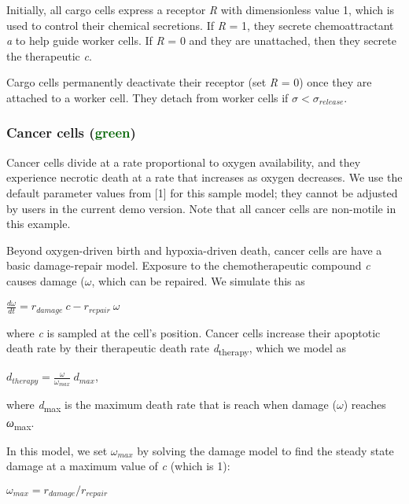 \documentclass{article}
\begin{document}
Initially, all cargo cells express a receptor \emph{R} with
dimensionless value 1, which is used to control their chemical
secretions. If \emph{R} = 1, they secrete chemoattractant \emph{a} to
help guide worker cells. If \emph{R} = 0 and they are unattached, then
they secrete the therapeutic \emph{c}.

Cargo cells permanently deactivate their receptor (set \emph{R} = 0)
once they are attached to a worker cell. They detach from worker cells
if $\sigma < \sigma_{release}$.

\subsubsection{Cancer cells (\textcolor{darkgreen}{green})}\label{cancer-cells-green}

Cancer cells divide at a rate proportional to oxygen availability, and
they experience necrotic death at a rate that increases as oxygen
decreases. We use the default parameter values from {[}1{]} for this
sample model; they cannot be adjusted by users in the current demo
version. Note that all cancer cells are non-motile in this example.

Beyond oxygen-driven birth and hypoxia-driven death, cancer cells are
have a basic damage-repair model. Exposure to the chemotherapeutic
compound \emph{c} causes damage ($\omega$, which can be repaired. We
simulate this as

\begin{center}
$\frac{d\omega}{dt} = r_{damage} \: c - r_{repair} \: \omega$
\end{center}

where \emph{c} is sampled at the cell's position. Cancer cells increase
their apoptotic death rate by their therapeutic death rate
\emph{d}\textsubscript{therapy}, which we model as

\begin{center}
$d_{therapy} = \frac{\omega}{\omega_{max}} \: d_{max}$,
\end{center}

where \emph{d}\textsubscript{max} is the maximum death rate that is
reach when damage ($\omega$) reaches \emph{ω}\textsubscript{max}.

In this model, we set $\omega_{max}$ by solving the damage
model to find the steady state damage at a maximum value of \emph{c}
(which is 1):

\begin{center}
$\omega_{max} = r_{damage} / r_{repair}$
\end{center}
\end{document}
